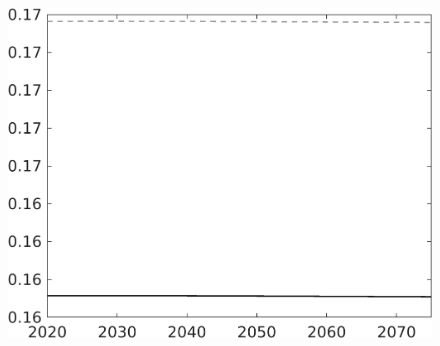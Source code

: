 \documentclass[12pt]{article}
\begin{document}
\begin{figure}[h!!]
\begin{minipage}[]{0.32\textwidth}
	\end{minipage}	
	\begin{minipage}[]{0.32\textwidth}
		\includegraphics[width=1\textwidth]{../../codding_model/own_basedOnFried/optimalPol_010922_revision/figures/all_13Sept22/CompTaul_LFBAU_Reg0_Ln_spillover0_nsk0_xgr0_knspil0_sep1_countec0_GovRev0_etaa0.79_lgd0.png}
	\end{minipage}
\end{figure}
\end{document}
